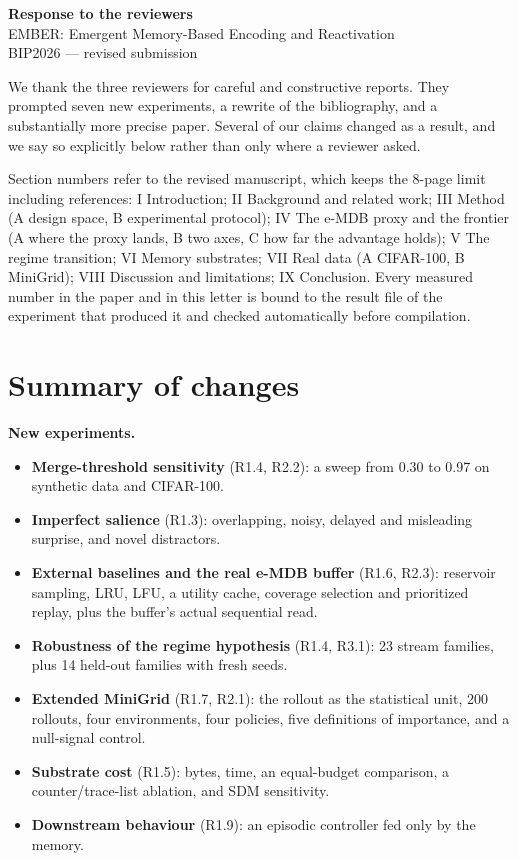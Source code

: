 \documentclass[11pt]{article}
\begin{document}
\begin{center}
{\Large\bfseries Response to the reviewers}\\[4pt]
{\large EMBER: Emergent Memory-Based Encoding and Reactivation}\\[2pt]
BIP2026 --- revised submission
\end{center}

We thank the three reviewers for careful and constructive reports. They
prompted seven new experiments, a rewrite of the bibliography, and a
substantially more precise paper. Several of our claims changed as a result,
and we say so explicitly below rather than only where a reviewer asked.

Section numbers refer to the revised manuscript, which keeps the 8-page limit
including references: I Introduction; II Background and related work; III
Method (A design space, B experimental protocol); IV The e-MDB proxy and the
frontier (A where the proxy lands, B two axes, C how far the advantage holds);
V The regime transition; VI Memory substrates; VII Real data (A CIFAR-100, B
MiniGrid); VIII Discussion and limitations; IX Conclusion. Every measured
number in the paper and in this letter is bound to the result file of the
experiment that produced it and checked automatically before compilation.

\section*{Summary of changes}

\textbf{New experiments.}
\begin{itemize}
\item \textbf{Merge-threshold sensitivity} (R1.4, R2.2): a sweep from 0.30 to 0.97 on synthetic data and CIFAR-100.
\item \textbf{Imperfect salience} (R1.3): overlapping, noisy, delayed and misleading surprise, and novel distractors.
\item \textbf{External baselines and the real e-MDB buffer} (R1.6, R2.3): reservoir sampling, LRU, LFU, a utility cache, coverage selection and prioritized replay, plus the buffer's actual sequential read.
\item \textbf{Robustness of the regime hypothesis} (R1.4, R3.1): 23 stream families, plus 14 held-out families with fresh seeds.
\item \textbf{Extended MiniGrid} (R1.7, R2.1): the rollout as the statistical unit, 200 rollouts, four environments, four policies, five definitions of importance, and a null-signal control.
\item \textbf{Substrate cost} (R1.5): bytes, time, an equal-budget comparison, a counter/trace-list ablation, and SDM sensitivity.
\item \textbf{Downstream behaviour} (R1.9): an episodic controller fed only by the memory.
\end{itemize}
\end{document}
